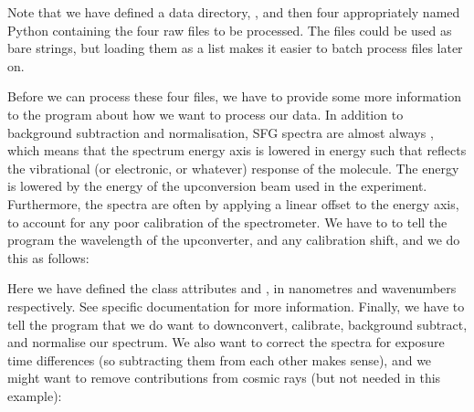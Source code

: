 \documentclass[a4paper,10pt,english]{sphinxmanual}
\begin{document}
\sphinxAtStartPar
Note that we have defined a data directory, , and then four appropriately named Python  containing the four raw  files to be processed. The files could be used as bare strings, but loading them as a list makes it easier to batch process files later on.

\sphinxAtStartPar
Before we can process these four files, we have to provide some more information to the program about how we want to process our data. In addition to background subtraction and normalisation, SFG spectra are almost always , which means that the spectrum energy axis is lowered in energy such that reflects the vibrational (or electronic, or whatever) response of the molecule. The energy is lowered by the energy of the upconversion beam used in the experiment. Furthermore, the spectra are often  by applying a linear offset to the energy axis, to account for any poor calibration of the spectrometer. We have to to tell the program the wavelength of the upconverter, and any calibration shift, and we do this as follows:

\begin{sphinxVerbatim}[commandchars=\\\{\}]
  
  
\end{sphinxVerbatim}

\sphinxAtStartPar
Here we have defined the class attributes  and , in nanometres and wavenumbers respectively. See specific documentation for more information. Finally, we have to tell the program that we do want to downconvert, calibrate, background subtract, and normalise our spectrum. We also want to correct the spectra for exposure time differences (so subtracting them from each other makes sense), and we might want to remove contributions from cosmic rays (but not needed in this example):

\begin{sphinxVerbatim}[commandchars=\\\{\}]
  
  
  
  
  
  
\end{sphinxVerbatim}
\end{document}

